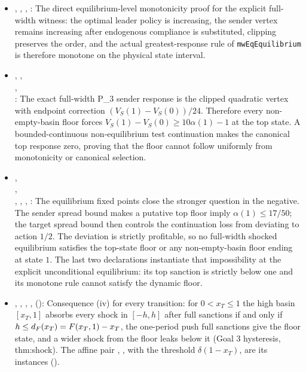 \begin{itemize}[leftmargin=1.4em,itemsep=1pt]
\item {}, , , : The direct equilibrium-level monotonicity proof for the explicit full-width witness: the optimal leader policy is increasing, the sender vertex remains increasing after endogenous compliance is substituted, clipping preserves the order, and the actual greatest-response rule of \texttt{mwEqEquilibrium} is therefore monotone on the physical state interval.
\item {},
,\\
,\\
: The exact full-width P\_3 sender response is the clipped quadratic vertex with endpoint correction $(V_S(1)-V_S(0))/24$.  Therefore every non-empty-basin floor forces $V_S(1)-V_S(0)\ge10\alpha(1)-1$ at the top state.  A bounded-continuous non-equilibrium test continuation makes the canonical top response zero, proving that the floor cannot follow uniformly from monotonicity or canonical selection.
\item {},\\
,\\
,
, , : The equilibrium fixed points close the stronger question in the negative. The sender spread bound makes a putative top floor imply $\alpha(1)\le17/50$; the target spread bound then controls the continuation loss from deviating to action $1/2$. The deviation is strictly profitable, so no full-width shocked equilibrium satisfies the top-state floor or any non-empty-basin floor ending at state $1$. The last two declarations instantiate that impossibility at the explicit unconditional equilibrium: its top sanction is strictly below one and its monotone rule cannot satisfy the dynamic floor.
\item {}, , , ,  (): Consequence (iv) for every transition: for $0<x_T\le1$ the high basin $[x_T,1]$ absorbs every shock in $[-h,h]$ after full sanctions if and only if $h\le d_{F}(x_T)=F(x_T,1)-x_T$, the one-period push full sanctions give the floor state, and a wider shock from the floor leaks below it (Goal 3 hysteresis, thm:shock). The affine pair , , with the threshold $\delta(1-x_T)$, are its instances ().

\end{itemize}
